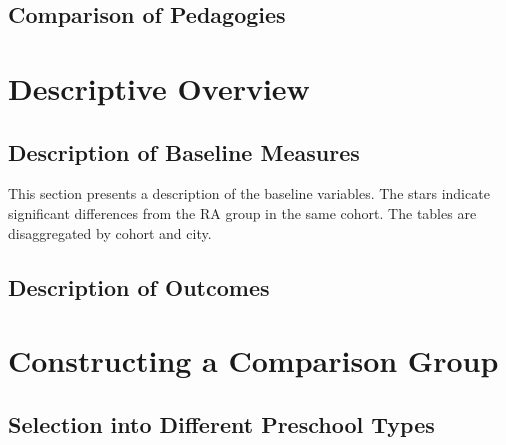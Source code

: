 \documentclass[12pt]{article}
\begin{document}
\subsection{Comparison of Pedagogies}

\section{Descriptive Overview}
\subsection{Description of Baseline Measures}
This section presents a description of the baseline variables. The stars indicate significant differences from the RA group in the same cohort. The tables are disaggregated by cohort and city.





























\subsection{Description of Outcomes}

\section{Constructing a Comparison Group} %
\subsection{Selection into Different Preschool Types}
\end{document}
